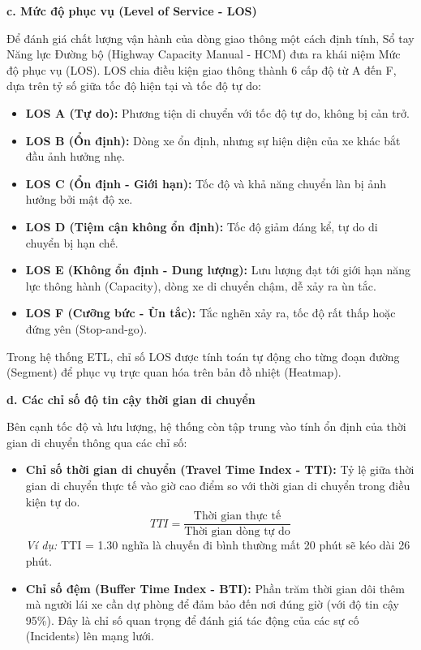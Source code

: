 \textbf{c. Mức độ phục vụ (Level of Service - LOS)}

Để đánh giá chất lượng vận hành của dòng giao thông một cách định tính, Sổ tay Năng lực Đường bộ (Highway Capacity Manual - HCM) đưa ra khái niệm Mức độ phục vụ (LOS). LOS chia điều kiện giao thông thành 6 cấp độ từ A đến F, dựa trên tỷ số giữa tốc độ hiện tại và tốc độ tự do:
\begin{itemize}
    \item \textbf{LOS A (Tự do):} Phương tiện di chuyển với tốc độ tự do, không bị cản trở.
    \item \textbf{LOS B (Ổn định):} Dòng xe ổn định, nhưng sự hiện diện của xe khác bắt đầu ảnh hưởng nhẹ.
    \item \textbf{LOS C (Ổn định - Giới hạn):} Tốc độ và khả năng chuyển làn bị ảnh hưởng bởi mật độ xe.
    \item \textbf{LOS D (Tiệm cận không ổn định):} Tốc độ giảm đáng kể, tự do di chuyển bị hạn chế.
    \item \textbf{LOS E (Không ổn định - Dung lượng):} Lưu lượng đạt tới giới hạn năng lực thông hành (Capacity), dòng xe di chuyển chậm, dễ xảy ra ùn tắc.
    \item \textbf{LOS F (Cưỡng bức - Ùn tắc):} Tắc nghẽn xảy ra, tốc độ rất thấp hoặc đứng yên (Stop-and-go).
\end{itemize}
Trong hệ thống ETL, chỉ số LOS được tính toán tự động cho từng đoạn đường (Segment) để phục vụ trực quan hóa trên bản đồ nhiệt (Heatmap).

\textbf{d. Các chỉ số độ tin cậy thời gian di chuyển}

Bên cạnh tốc độ và lưu lượng, hệ thống còn tập trung vào tính ổn định của thời gian di chuyển thông qua các chỉ số:
\begin{itemize}
    \item \textbf{Chỉ số thời gian di chuyển (Travel Time Index - TTI):} Tỷ lệ giữa thời gian di chuyển thực tế vào giờ cao điểm so với thời gian di chuyển trong điều kiện tự do.
    $$TTI = \frac{\text{Thời gian thực tế}}{\text{Thời gian dòng tự do}}$$
    \textit{Ví dụ:} TTI = 1.30 nghĩa là chuyến đi bình thường mất 20 phút sẽ kéo dài 26 phút.
    
    \item \textbf{Chỉ số đệm (Buffer Time Index - BTI):} Phần trăm thời gian dôi thêm mà người lái xe cần dự phòng để đảm bảo đến nơi đúng giờ (với độ tin cậy 95\%). Đây là chỉ số quan trọng để đánh giá tác động của các sự cố (Incidents) lên mạng lưới.
\end{itemize}

